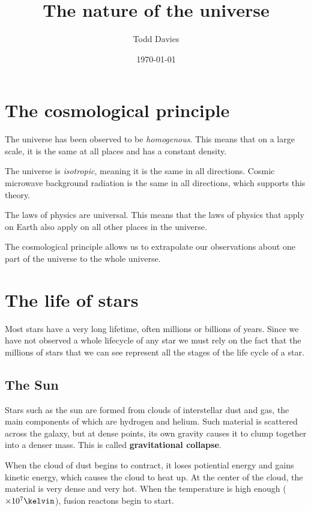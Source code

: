 \documentclass{article}
\title{The nature of the universe}
\author{Todd Davies}
\date{\today}
\begin{document}
\lhead{\today}

\maketitle

\section{The cosmological principle}
\thispagestyle{empty}

The universe has been observed to be {\it homogenous}. This means that on a
large scale, it is the same at all places and has a constant density.

The universe is {\it isotropic}, meaning it is the same in all directions.
Cosmic microwave background radiation is the same in all directions, which
supports this theory.

The laws of physics are universal. This means that the laws of physics that
apply on Earth also apply on all other places in the universe.

The cosmological principle allows us to extrapolate our observations about one
part of the universe to the whole universe.

\section{The life of stars}

Most stars have a very long lifetime, often millions or billions of years. Since
we have not observed a whole lifecycle of any star we must rely on the fact that
the millions of stars that we can see represent all the stages of the life cycle
of a star.

\subsection{The Sun}

Stars such as the sun are formed from clouds of interstellar dust and gas, the
main components of which are hydrogen and helium. Such material is scattered
across the galaxy, but at dense points, its own gravity causes it to clump
together into a denser mass. This is called {\bf gravitational collapse}.

When the cloud of dust begins to contract, it loses potiential energy and gains
kinetic energy, which causes the cloud to heat up. At the center of the cloud,
the material is very dense and very hot. When the temperature is high enough
($\times10^7\kelvin$), fusion reactons begin to start.
\end{document}
